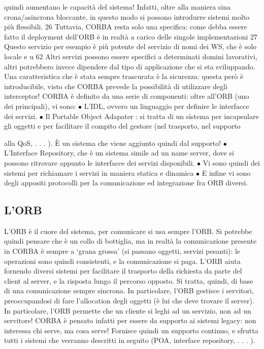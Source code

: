quindi aumentano le capacità del sistema! Infatti, oltre alla maniera sina
crona/asincrona bloccante, in questo modo si possono introdurre sistemi
molto più flessibili.
26 Tuttavia, CORBA resta solo una specifica: come debba essere fatto il deployment
dell'ORB è in realtà a carico delle singole implementazioni
27 Questo servizio per esempio è più potente del servizio di nomi dei WS, che è solo locale
e u
62
Altri servizi possono essere specifici a determinati domini lavorativi, altri potrebbero invece dipendere dal tipo di
applicazione che si sta sviluppando.
Una caratteristica che è stata sempre trascurata è la sicurezza: questa però è introducibile, visto che CORBA prevede 
la possibilità di utilizzare degli interceptor!
CORBA è definito da una serie di componenti: oltre all'ORB (uno dei
principali), vi sono:
$\bullet$ L'IDL, ovvero un linguaggio per definire le interfacce dei servizi.
$\bullet$ Il Portable Object Adapater : si tratta di un sistema per incapsulare gli
oggetti e per facilitare il compito del gestore (nel trasporto, nel supporto

alla QoS, . . . ). È un sistema che viene aggiunto quindi dal supporto!
$\bullet$ L'Interface Repository, che è un sistema simile ad un name server, dove si
possono ritrovare appunto le interfacce dei servizi disponibili.
$\bullet$ Vi sono quindi dei sistemi per richiamare i servizi in maniera statica e
dinamica
$\bullet$ E infine vi sono degli appositi protocolli per la comunicazione ed integrazione fra ORB diversi.
\subsection{L'ORB}
L'ORB è il cuore del sistema, per comunicare si usa sempre l'ORB. Si potrebbe
quindi pensare che è un collo di bottiglia, ma in realtà la comunicazione presente
in CORBA è sempre a {`}grana grossa' (si passano oggetti, servizi pesanti): le
operazioni sono quindi consistenti, e la comunicazione si paga. L'ORB aiuta
fornendo diversi sistemi per facilitare il trasporto della richiesta da parte del
client al server, e la risposta lungo il percorso opposto. Si tratta, quindi, di base
di una comunicazione sempre sincrona.
In particolare, l'ORB gestisce i servitori, preoccupandosi di fare l'allocation
degli oggetti (è lui che deve trovare il server). In particolare, l'ORB permette
che un cliente si leghi ad un servizio, non ad un servitore! CORBA è pensato
infatti per essere da supporto ai sistemi legacy: non interessa chi serve, ma
cosa serve! Fornisce quindi un supporto continuo, e sfrutta tutti i sistemi che
verranno descritti in seguito (POA, interface repository, . . . ).
